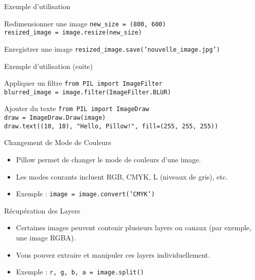 \begin{frame}{Exemple d'utilisation}

    \begin{block}{Redimensionner une image}
        \texttt{new\_size = (800, 600) \\
            resized\_image = image.resize(new\_size)}
    \end{block}

    \begin{block}{Enregistrer une image}
        \texttt{resized\_image.save('nouvelle\_image.jpg')}
    \end{block}
\end{frame}

\begin{frame}{Exemple d'utilisation (suite)}
    \begin{block}{Appliquer un filtre}
        \texttt{from PIL import ImageFilter \\
            blurred\_image = image.filter(ImageFilter.BLUR)}
    \end{block}

    \begin{block}{Ajouter du texte}
        \texttt{from PIL import ImageDraw \\
            draw = ImageDraw.Draw(image) \\
            draw.text((10, 10), "Hello, Pillow!", fill=(255, 255, 255))}
    \end{block}
\end{frame}

\begin{frame}{Changement de Mode de Couleurs}
    \begin{itemize}
        \item Pillow permet de changer le mode de couleurs d'une image.
        \item Les modes courants incluent RGB, CMYK, L (niveaux de gris), etc.
        \item Exemple : \texttt{image = image.convert('CMYK')}
    \end{itemize}
\end{frame}

\begin{frame}{Récupération des Layers}
    \begin{itemize}
        \item Certaines images peuvent contenir plusieurs layers ou canaux (par exemple, une
              image RGBA).
        \item Vous pouvez extraire et manipuler ces layers individuellement.
        \item Exemple : \texttt{r, g, b, a = image.split()}
    \end{itemize}
\end{frame}

